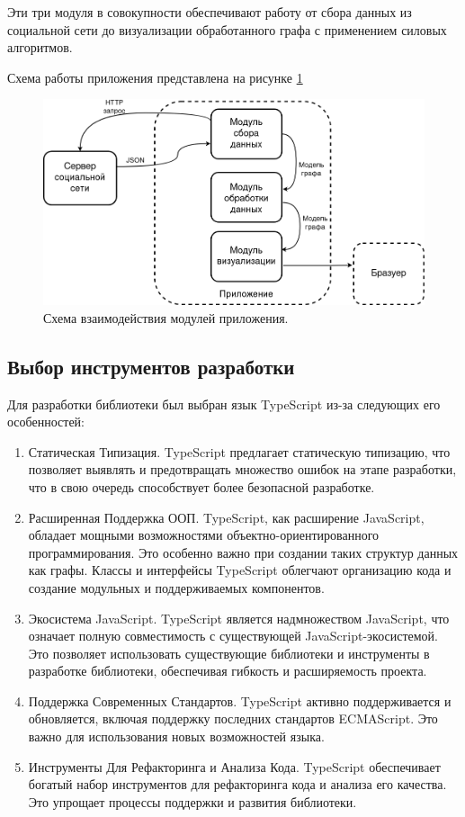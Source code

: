 \documentclass[14pt, russian]{scrartcl}
\begin{document}
Эти три модуля в совокупности обеспечивают работу от сбора данных из социальной сети до визуализации обработанного графа с применением силовых алгоритмов.

Схема работы приложения представлена на рисунке \ref{fig:app_scheme}


\begin{figure}[H]
\centering
  \begin{minipage}[t]{.9\textwidth}
  \centering
\includegraphics[width=.9\textwidth]{./imgs/app_scheme.png}
  \end{minipage}
\caption{Схема взаимодействия модулей приложения.}
\label{fig:app_scheme}
\end{figure}

\subsection{Выбор инструментов разработки}

Для разработки библиотеки был выбран язык TypeScript \cite{TS} из-за следующих его особенностей:

\begin{enumerate}
  \item Статическая Типизация. TypeScript предлагает статическую типизацию, что позволяет выявлять и предотвращать множество ошибок на этапе разработки, что в свою очередь способствует более безопасной разработке.
  \item Расширенная Поддержка ООП. TypeScript, как расширение JavaScript, обладает мощными возможностями объектно-ориентированного программирования. Это особенно важно при создании таких структур данных как графы. Классы и интерфейсы TypeScript облегчают организацию кода и создание модульных и поддерживаемых компонентов.
  \item Экосистема JavaScript. TypeScript является надмножеством JavaScript, что означает полную совместимость с существующей JavaScript-экосистемой. Это позволяет использовать существующие библиотеки и инструменты в разработке библиотеки, обеспечивая гибкость и расширяемость проекта.
  \item Поддержка Современных Стандартов. TypeScript активно поддерживается и обновляется, включая поддержку последних стандартов ECMAScript. Это важно для использования новых возможностей языка.
  \item Инструменты Для Рефакторинга и Анализа Кода. TypeScript обеспечивает богатый набор инструментов для рефакторинга кода и анализа его качества. Это упрощает процессы поддержки и развития библиотеки.
\end{enumerate}
\end{document}
